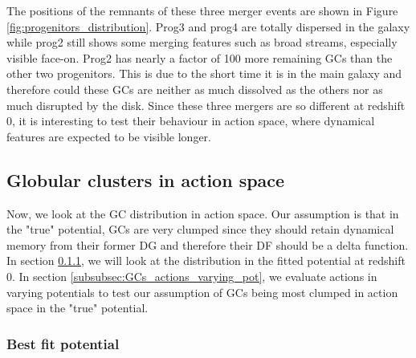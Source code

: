 The positions of the remnants of these three merger events are shown in Figure \ref{fig:progenitors_distribution}. Prog3 and prog4 are totally dispersed in the galaxy while prog2 still shows some merging features such as broad streams, especially visible face-on. Prog2 has nearly a factor of 100 more remaining \acp{GC} than the other two progenitors. This is due to the short time it is in the main galaxy and therefore could these \acp{GC} are neither as much dissolved as the others nor as much disrupted by the disk. Since these three mergers are so different at redshift 0, it is interesting to test their behaviour in action space, where dynamical features are expected to be visible longer. 

\subsection{Globular clusters in action space}\label{subsec:GCs_action_space}
Now, we look at the \ac{GC} distribution in action space. Our assumption is that in the "true" potential, \acp{GC} are very clumped since they should retain dynamical memory from their former \ac{DG} and therefore their \ac{DF} should be a delta function. In section \ref{subsubsec:GCs_actions_right_pot}, we will look at the distribution in the fitted potential at redshift 0. In section \ref{subsubsec:GCs_actions_varying_pot}, we evaluate actions in varying potentials to test our assumption of \acp{GC} being most clumped in action space in the "true" potential. 

\subsubsection{Best fit potential}\label{subsubsec:GCs_actions_right_pot}

